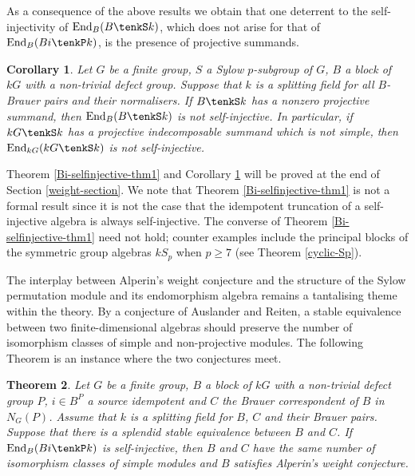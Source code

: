 \documentclass{amsart}
\theoremstyle{plain}\newtheorem{Theorem}{Theorem}[section]
\theoremstyle{plain}\newtheorem{Conjecture}[Theorem]{Conjecture}
\theoremstyle{plain}\newtheorem{Corollary}[Theorem]{Corollary}
\theoremstyle{plain}\newtheorem{Lemma}[Theorem]{Lemma}
\theoremstyle{plain}\newtheorem{Proposition}[Theorem]{Proposition}
\theoremstyle{definition}\newtheorem{Definition}[Theorem]{Definition}
\theoremstyle{definition}\newtheorem{Example}[Theorem]{Example}
\theoremstyle{definition}\newtheorem{Examples}[Theorem]{Examples}
\theoremstyle{definition}\newtheorem{Exercise}[Theorem]{Exercise}
\theoremstyle{definition}\newtheorem{Notation}[Theorem]{Notation}
\theoremstyle{definition}\newtheorem{Remark}[Theorem]{Remark}
\theoremstyle{definition}\newtheorem{Remarks}[Theorem]{Remarks}
\theoremstyle{plain}\newtheorem{Statement}[Theorem]{}
\def\End{\mathrm{End}}
\begin{document}
As a consequence of  the above results  we obtain that one deterrent to  the  
self-injectivity   of  $\End_B(B\tenkS k)$, which does not arise  for   that of  
$\End_B(Bi\tenkP k)$, is  the presence of projective   summands.

\begin{Corollary} \label{noprojective-cor} 
Let $G$ be a finite group,  $S$ a Sylow $p$-subgroup of $G$, 
$B$ a block of $kG$ with a non-trivial defect group.  Suppose that $k$ is a splitting 
field for all $B$-Brauer pairs and their normalisers. If $B\tenkS  k $ has  a  nonzero 
projective  summand, then  $\End_B(B\tenkS k)$  is not self-injective. In particular, if 
$kG \tenkS k $  has a  projective indecomposable  summand which is not simple, then  
$\End_{kG} (kG \tenkS k)$  is not self-injective. 
\end{Corollary} 

Theorem \ref{Bi-selfinjective-thm1}  and Corollary \ref{noprojective-cor} 
 will be proved at the end of Section \ref{weight-section}.  We note that 
 Theorem \ref{Bi-selfinjective-thm1} is  not a  formal result  since it is not 
  the case that  the  idempotent truncation of a self-injective algebra   is   always 
self-injective. The converse of Theorem \ref{Bi-selfinjective-thm1}  need not hold; 
counter examples include  the principal 
blocks of the symmetric group algebras $kS_p$ when $p\geq 7$ (see 
Theorem \ref{cyclic-Sp}). 

\medskip
The  interplay between   Alperin's weight conjecture and  the structure of the Sylow 
permutation module and its endomorphism algebra   remains a tantalising  theme 
within the theory. 
By a conjecture of Auslander and Reiten, a stable equivalence
between two  finite-dimensional algebras  should preserve the number of 
isomorphism classes of simple and non-projective  modules.
The following Theorem is an instance where the two conjectures meet.

\begin{Theorem}\label{splendid-thm}  
Let $G$ be a finite group, $B$ a  block of $kG$ with a non-trivial defect group   $P$, 
$ i \in B^P$ a source idempotent  and  $C$  the Brauer  correspondent  of $B$ 
in $N_G(P)$.  Assume that $k$ is a splitting field for $B$, $C$  and their Brauer pairs.
Suppose that  there is a splendid   stable  equivalence between $B$ and $C$.  
If $\End_B(Bi\tenkP k)$ is 
self-injective, then  $B$ and $C$ have the  same number of isomorphism classes  
of  simple modules and   $B$ satisfies Alperin's weight conjecture.
\end{Theorem}
  
\end{document}
